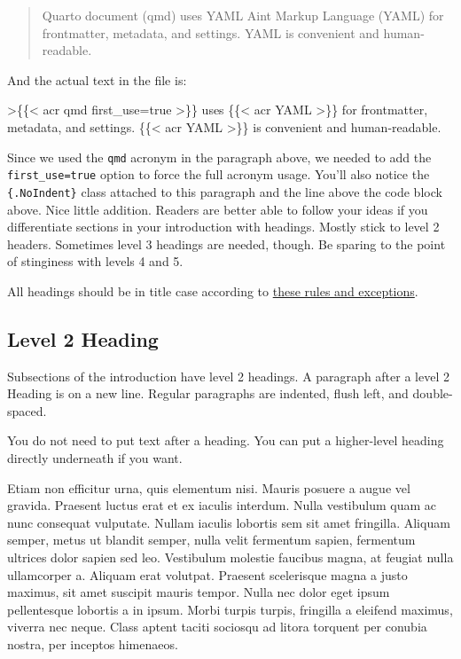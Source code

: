 \documentclass[
  man,
  floatsintext,
  longtable,
  nolmodern,
  notxfonts,
  notimes,
  mask,
  colorlinks=true,linkcolor=blue,citecolor=blue,urlcolor=blue]{apa7}
\newenvironment{Shaded}{\begin{snugshade}}{\end{snugshade}}
\newcommand{\AttributeTok}[1]{\textcolor[rgb]{0.40,0.45,0.13}{#1}}
\begin{document}
\begin{quote}
Quarto document (qmd) uses YAML Aint Markup Language (YAML) for
frontmatter, metadata, and settings. YAML is convenient and
human-readable.
\end{quote}

\noindent And the actual text in the file is:

\begin{Shaded}
\begin{Highlighting}[]
\AttributeTok{\textgreater{}\{\{\textless{} acr qmd first\_use=true \textgreater{}\}\} uses \{\{\textless{} acr YAML \textgreater{}\}\} for frontmatter,}
\AttributeTok{metadata, and settings. \{\{\textless{} acr YAML \textgreater{}\}\} is convenient and human{-}readable.}
\end{Highlighting}
\end{Shaded}

 Since we used the \texttt{qmd} acronym in the paragraph above, we
needed to add the \texttt{first\_use=true} option to force the full
acronym usage. You'll also notice the \texttt{\{.NoIndent\}} class
attached to this paragraph and the line above the code block above. Nice
little addition. Readers are better able to follow your ideas if you
differentiate sections in your introduction with headings. Mostly stick
to level 2 headers. Sometimes level 3 headings are needed, though. Be
sparing to the point of stinginess with levels 4 and 5.

All headings should be in title case according to
\href{https://apastyle.apa.org/style-grammar-guidelines/capitalization/title-case}{these
rules and exceptions}.

\subsection{Level 2 Heading}\label{level-2-heading}

Subsections of the introduction have level 2 headings. A paragraph after
a level 2 Heading is on a new line. Regular paragraphs are indented,
flush left, and double-spaced.

You do not need to put text after a heading. You can put a higher-level
heading directly underneath if you want.

Etiam non efficitur urna, quis elementum nisi. Mauris posuere a augue
vel gravida. Praesent luctus erat et ex iaculis interdum. Nulla
vestibulum quam ac nunc consequat vulputate. Nullam iaculis lobortis sem
sit amet fringilla. Aliquam semper, metus ut blandit semper, nulla velit
fermentum sapien, fermentum ultrices dolor sapien sed leo. Vestibulum
molestie faucibus magna, at feugiat nulla ullamcorper a. Aliquam erat
volutpat. Praesent scelerisque magna a justo maximus, sit amet suscipit
mauris tempor. Nulla nec dolor eget ipsum pellentesque lobortis a in
ipsum. Morbi turpis turpis, fringilla a eleifend maximus, viverra nec
neque. Class aptent taciti sociosqu ad litora torquent per conubia
nostra, per inceptos himenaeos.
\end{document}
